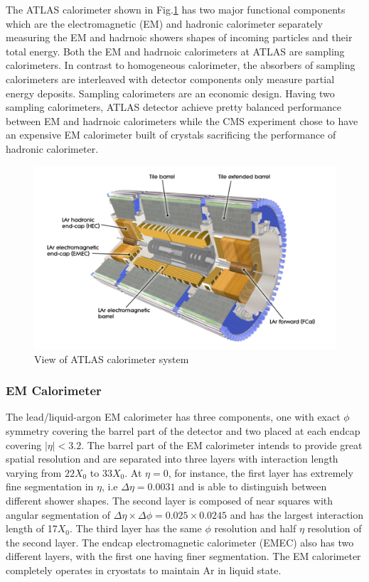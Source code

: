 \label{sec:detector-calo}

The ATLAS calorimeter shown in Fig.\ref{fig:detector-calo} has two major functional components which are the electromagnetic (EM) and hadronic calorimeter separately measuring the EM and hadrnoic showers shapes of incoming particles and their total energy. Both the EM and hadrnoic calorimeters at ATLAS are sampling calorimeters. In contrast to homogeneous calorimeter, the absorbers of sampling calorimeters are interleaved with detector components only measure partial energy deposits. Sampling calorimeters are an economic design. Having two sampling calorimeters, ATLAS detector achieve pretty balanced performance between EM and hadrnoic calorimeters while the CMS experiment chose to have an expensive EM calorimeter built of crystals sacrificing the performance of hadronic calorimeter. 


\begin{figure}[htpb!]
\begin{center}
  \includegraphics[width=0.9\linewidth]{figures/detector/calo}
\caption{View of ATLAS calorimeter system}
\label{fig:detector-calo}
\end{center}
\end{figure}

 
\subsubsection{EM Calorimeter}

The lead/liquid-argon EM calorimeter has three components, one with exact $\phi$ symmetry covering the barrel part of the detector and two placed at each endcap covering $|\eta|<3.2$. The barrel part of the EM calorimeter intends to provide great spatial resolution and are separated into three layers with interaction length varying from $22X_0$ to $33X_0$. At $\eta =0$, for instance, the first layer has extremely fine segmentation in $\eta$, i.e $\Delta \eta = 0.0031$ and is able to distinguish between different shower shapes. The second layer is composed of near squares with angular segmentation of $\Delta \eta \times \Delta \phi = 0.025 \times 0.0245$ and has the largest interaction length of 17$X_0$. The third layer has the same $\phi$ resolution and half $\eta$ resolution of the second layer. 
The endcap electromagnetic calorimeter (EMEC) also has two different layers, with the first one having finer segmentation. The EM calorimeter completely operates in cryostats to maintain Ar in liquid state.

